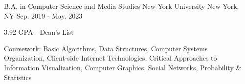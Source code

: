 

\begin{cventries}

  \cventry
    {B.A. in Computer Science and Media Studies} %
    {New York University} %
    {New York, NY} %
    {Sep. 2019 - May. 2023} %
    {
      \begin{cvitems} %
        \item {3.92 GPA - Dean's List}
        \item {Coursework: Basic Algorithms, Data Structures, Computer Systems Organization, Client-side Internet Technologies, Critical Approaches to Information Visualization, Computer Graphics, Social Networks, Probability \& Statistics}
      \end{cvitems}
    }

\end{cventries}
